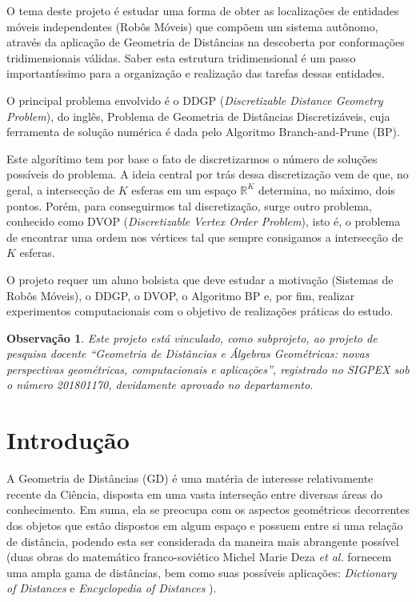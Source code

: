 \documentclass[11pt]{article}
\newtheorem{obs}{Observação}[section]
\begin{document}
O tema deste projeto é estudar uma forma de obter as localizações de entidades móveis independentes (Robôs Móveis) que compõem um sistema autônomo, através da aplicação de Geometria de Distâncias na descoberta por conformações tridimensionais válidas. Saber esta estrutura tridimensional é um passo importantíssimo para a organização e realização das tarefas dessas entidades.

O principal problema envolvido é o DDGP ({\emph{Discretizable Distance Geometry Problem}}), do inglês, Problema de Geometria de Distâncias Discretizáveis, cuja ferramenta de solução numérica é dada pelo Algoritmo Branch-and-Prune (BP). 

Este algorítimo tem por base o fato de discretizarmos o número de soluções possíveis do problema. A ideia central por trás dessa discretização vem de que, no geral, a intersecção de $K$ esferas em um espaço $\mathbb{R}^K$ determina, no máximo, dois pontos. Porém, para conseguirmos tal discretização, surge outro problema, conhecido como DVOP (\emph{Discretizable Vertex Order Problem}), isto é, o problema de encontrar uma ordem nos vértices tal que sempre consigamos a intersecção de $K$ esferas. \cite{carlile:DDGP}

O projeto requer um aluno bolsista que deve estudar a motivação (Sistemas de Robôs Móveis), o DDGP, o DVOP, o Algoritmo BP e, por fim, realizar experimentos computacionais com o objetivo de realizações práticas do estudo.

\begin{obs}
	Este projeto está vinculado, como subprojeto, ao projeto de pesquisa docente ``Geometria de Distâncias e Álgebras Geométricas: novas perspectivas geométricas, computacionais e aplicações'', registrado no SIGPEX sob o número 201801170, devidamente aprovado no departamento.
\end{obs}


\section{Introdução}

A Geometria de Distâncias (GD) é uma matéria de interesse relativamente recente da Ciência, disposta em uma vasta interseção entre diversas áreas do conhecimento. Em suma, ela se preocupa com os aspectos geométricos decorrentes dos objetos que estão dispostos em algum espaço e possuem entre si uma relação de distância, podendo esta ser considerada da maneira mais abrangente possível (duas obras do matemático franco-soviético Michel Marie Deza {\emph{et al.}} fornecem uma ampla gama de distâncias, bem como suas possíveis aplicações:  {\emph{Dictionary of Distances}} \cite{deza2006dictionary} e {\emph{Encyclopedia of Distances}} \cite{deza2009encyclopedia}).
\end{document}
